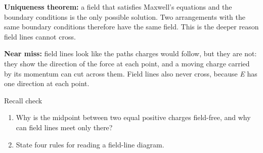 \documentclass[11pt]{article}
\begin{document}
\begin{keepsection}
\textbf{Uniqueness theorem:} a field that satisfies Maxwell’s equations and the boundary conditions is the only possible solution. Two arrangements with the same boundary conditions therefore have the same field. This is the deeper reason field lines cannot cross.

\begin{notebox}\textbf{Near miss:} field lines look like the paths charges would follow, but they are not: they show the direction of the force at each point, and a moving charge carried by its momentum can cut across them. Field lines also never cross, because \textit{E} has one direction at each point.\end{notebox}

\begin{recallbox}{Recall check}
\begin{enumerate}
\item Why is the midpoint between two equal positive charges field-free, and why can field lines meet only there?
\item State four rules for reading a field-line diagram.
\end{enumerate}

\end{recallbox}
\end{keepsection}
\end{document}
